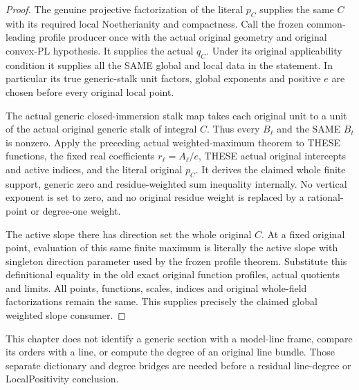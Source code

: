 \begin{proof}
The genuine projective factorization of the literal $p_C$ supplies the
same $C$ with its required local Noetherianity and compactness.
Call the frozen common-leading profile producer once with the actual
original geometry and original convex-PL hypothesis. It supplies the
actual $q_C$. Under its original applicability condition it supplies
all the SAME global and local data in the statement. In particular its
true generic-stalk unit factors, global exponents and positive $e$ are
chosen before every original local point.

The actual generic closed-immersion stalk map takes each original unit
to a unit of the actual original generic stalk of integral $C$. Thus
every $B_\ell$ and the SAME $B_t$ is nonzero. Apply the preceding actual
weighted-maximum theorem to THESE functions, the fixed real coefficients
$r_\ell=A_\ell/e$, THESE actual original intercepts and active indices,
and the literal original $p_C$. It derives the claimed whole finite
support, generic zero and residue-weighted sum inequality internally.
No vertical exponent is set to zero, and no original residue weight is
replaced by a rational-point or degree-one weight.

The active slope there has direction set the whole original $C$.
At a fixed original point, evaluation of this same finite maximum is
literally the active slope with singleton direction parameter used by
the frozen profile theorem. Substitute this definitional equality in
the old exact original function profiles, actual quotients and limits.
All points, functions, scales, indices and original whole-field
factorizations remain the same. This supplies precisely the claimed
global weighted slope consumer.
\end{proof}

This chapter does not identify a generic section with a model-line
frame, compare its orders with a line, or compute the degree of an
original line bundle. Those separate dictionary and degree bridges
are needed before a residual line-degree or LocalPositivity conclusion.
